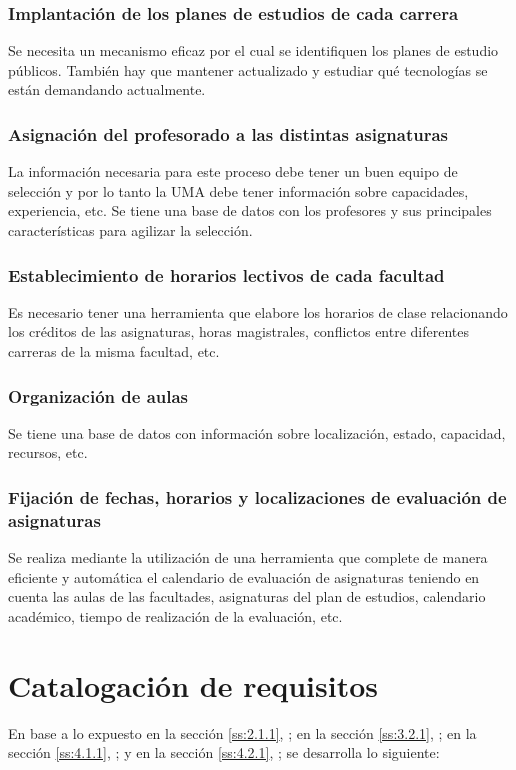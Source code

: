 \documentclass[11pt,a4paper,spanish,twoside]{report}
\begin{document}
\subsubsection{Implantación de los planes de estudios de cada carrera}
Se necesita un mecanismo eficaz por el cual se identifiquen los planes de
estudio públicos. También hay que mantener actualizado y estudiar qué
tecnologías se están demandando actualmente.  

\subsubsection{Asignación del profesorado a las distintas asignaturas}
La información necesaria para este proceso debe tener un buen equipo de
selección y por lo tanto la UMA debe tener información sobre capacidades,
experiencia, etc.
Se tiene una base de datos con los profesores y sus principales
características para agilizar la selección. 

\subsubsection{Establecimiento de horarios lectivos de cada facultad}
Es necesario tener una herramienta que elabore los horarios de clase
relacionando los créditos de las asignaturas, horas magistrales, conflictos
entre diferentes carreras de la misma facultad, etc.

\subsubsection{Organización de aulas}
Se tiene una base de datos con información sobre localización, estado,
capacidad, recursos, etc. 

\subsubsection{Fijación de  fechas, horarios y localizaciones de evaluación de
  asignaturas}
Se realiza mediante la utilización de una herramienta que complete de manera
eficiente y automática 
el calendario de evaluación de asignaturas teniendo en cuenta las aulas de
las facultades, asignaturas del plan de estudios, calendario académico,
tiempo de realización de la evaluación, etc.

\section{Catalogación de requisitos}
En base a lo expuesto 
en la sección \vref{ss:2.1.1}, \emph{}; 
en la sección \vref{ss:3.2.1}, \emph{}; 
en la sección \vref{ss:4.1.1}, \emph{}; y
en la sección \vref{ss:4.2.1}, \emph{};
se desarrolla lo siguiente:
\end{document}
